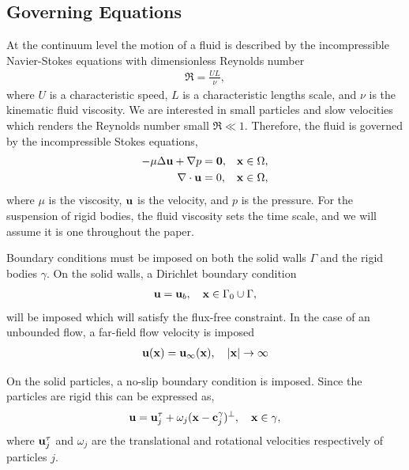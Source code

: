 \documentclass[preprint, 10pt]{elsarticle}
\begin{document}
\subsection{Governing Equations}\label{sec:governing}
At the continuum level the motion of a fluid is described by the
incompressible Navier-Stokes equations with dimensionless Reynolds
number
\begin{align*}
  \Re = \frac{UL}{\nu},
\end{align*}
where $U$ is a characteristic speed, $L$ is a characteristic lengths
scale, and $\nu$ is the kinematic fluid viscosity.  We are interested in
small particles and slow velocities which renders the Reynolds number
small $\Re \ll 1$.  Therefore, the fluid is governed by the
incompressible Stokes equations,
\begin{equation}
  \label{eq:stokes}
  \begin{aligned}
  -\mu\Delta \mathbf{u} + \nabla p &= \mathbf{0},
    &&{\mathbf{x}} \in \Omega, \\	  
  \nabla\cdot\mathbf{u} &= 0, && {\mathbf{x}} \in \Omega,
  \end{aligned}
\end{equation}
where $\mu$ is the viscosity, ${\mathbf{u}}$ is the velocity, and $p$ is the
pressure. For the suspension of rigid bodies, the fluid viscosity sets
the time scale, and we will assume it is one throughout the paper.

Boundary conditions must be imposed on both the solid walls $\Gamma$ and
the rigid bodies $\gamma$.  On the solid walls, a Dirichlet boundary
condition
\begin{align}
  \label{eq:boundary_condition}
  {\mathbf{u}} = {\mathbf{u}}_b, \quad {\mathbf{x}} \in \Gamma_0\cup\Gamma,
\end{align}
will be imposed which will satisfy the flux-free constraint.  In the
case of an unbounded flow, a far-field flow velocity is imposed
\begin{align*}
  {\mathbf{u}}({\mathbf{x}}) = {\mathbf{u}}_\infty({\mathbf{x}}), \quad |{\mathbf{x}}| \rightarrow \infty
\end{align*}

On the solid particles, a no-slip boundary condition is imposed. Since
the particles are rigid this can be expressed as,
\begin{align}
  \label{eq:particles_noslip}
  {\mathbf{u}} = {\mathbf{u}}^\tau_j + \omega_j({\mathbf{x}}-{\mathbf{c}}^\gamma_j)^\perp, \quad {\mathbf{x}} \in \gamma,
\end{align}
where ${\mathbf{u}}^\tau_j$ and $\omega_j$ are the translational and rotational velocities respectively of particles $j$.
\end{document}
